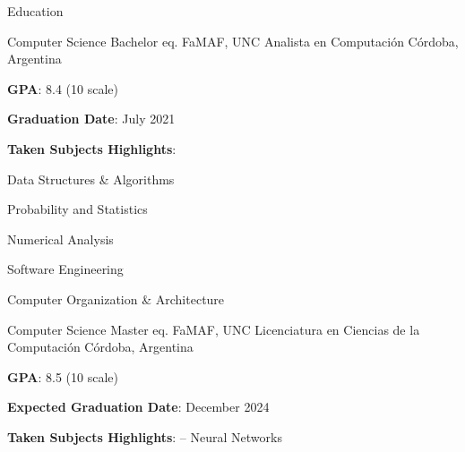 \documentclass{curriculum}
\begin{document}
\begin{cvsection}{Education}

    \makesectionitemheader
        {Computer Science Bachelor eq.}                             {FaMAF, UNC}
        {Analista en Computación}                           {Córdoba, Argentina}

        \begin{sectionitemlist}

        \item {
            \textbf{GPA}: 8.4 (10 scale)
        }
        \item {
            \textbf{Graduation Date}: July 2021
        }
        \item {
            \textbf{Taken Subjects Highlights}:
        }
        {
            \begin{colsectionitemlist}{3}
                \item{Data Structures \& Algorithms}
                \item{Probability and Statistics}
                \item{Numerical Analysis}
                \item{Software Engineering}
                \item{Computer Organization \& Architecture}
            \end{colsectionitemlist}
        }

        \end{sectionitemlist}

    \makesectionitemheader
        {Computer Science Master eq.}                               {FaMAF, UNC}
        {Licenciatura en Ciencias de la Computación}        {Córdoba, Argentina}

        \begin{sectionitemlist}

        \item {
            \textbf{GPA}: 8.5 (10 scale)
        }
        \item {
            \textbf{Expected Graduation Date}: December 2024
        }
        \item {
            \textbf{Taken Subjects Highlights}: – Neural Networks
        }

        \end{sectionitemlist}

\end{cvsection}

\end{document}
